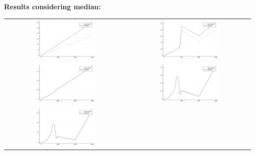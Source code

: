 \documentclass[a4paper,11pt]{article}
\begin{document}
\bf{Results considering median:}\\

\begin{tabular}{cc}
	\includegraphics[width=0.5\textwidth]{perf_median_3} & 
	\includegraphics[width=0.5\textwidth]{perf_median_10} \\
	\includegraphics[width=0.5\textwidth]{perf_median_100} &
	\includegraphics[width=0.5\textwidth]{perf_median_500} \\
	\includegraphics[width=0.5\textwidth]{perf_median_1000} &
\end{tabular}
\end{document}
